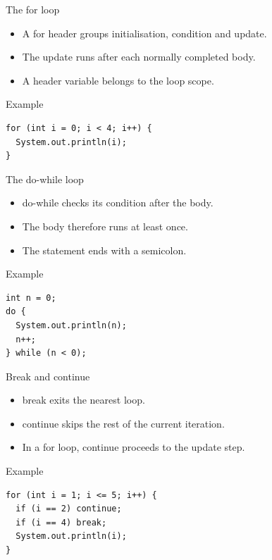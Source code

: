 \documentclass[10pt,aspectratio=169]{beamer}
\begin{document}
\begin{frame}[fragile,t]{The for loop}
\begin{itemize}
\item A for header groups initialisation, condition and update.
\item The update runs after each normally completed body.
\item A header variable belongs to the loop scope.
\end{itemize}
\vspace{1mm}\begin{block}{Example}
\begin{lstlisting}
for (int i = 0; i < 4; i++) {
  System.out.println(i);
}
\end{lstlisting}
\end{block}
\end{frame}

\begin{frame}[fragile,t]{The do-while loop}
\begin{itemize}
\item do-while checks its condition after the body.
\item The body therefore runs at least once.
\item The statement ends with a semicolon.
\end{itemize}
\vspace{1mm}\begin{block}{Example}
\begin{lstlisting}
int n = 0;
do {
  System.out.println(n);
  n++;
} while (n < 0);
\end{lstlisting}
\end{block}
\end{frame}

\begin{frame}[fragile,t]{Break and continue}
\begin{itemize}
\item break exits the nearest loop.
\item continue skips the rest of the current iteration.
\item In a for loop, continue proceeds to the update step.
\end{itemize}
\vspace{1mm}\begin{block}{Example}
\begin{lstlisting}
for (int i = 1; i <= 5; i++) {
  if (i == 2) continue;
  if (i == 4) break;
  System.out.println(i);
}
\end{lstlisting}
\end{block}
\end{frame}
\end{document}
